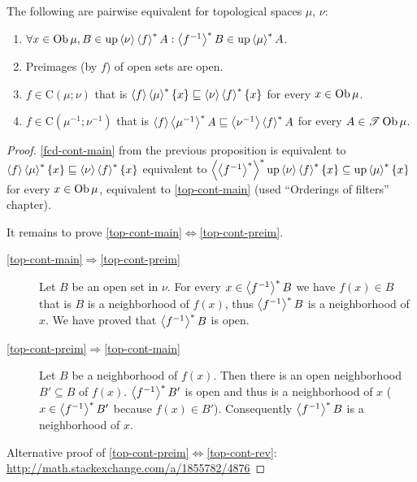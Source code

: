 \begin{cor}
  The following are pairwise equivalent for topological spaces $\mu$,
  $\nu$:
  \begin{enumerate}
    \item\label{top-cont-unfold} $\forall x \in \operatorname{Ob} \mu, B \in \operatorname{up} \left\langle \nu\right\rangle
    \left\langle f\right\rangle ^{\ast} A : \left\langle f^{- 1}\right\rangle ^{\ast} B \in
    \operatorname{up} \left\langle \mu\right\rangle ^{\ast} A$.

    \item\label{top-cont-preim} Preimages (by $f$) of open sets are open.

    \item\label{top-cont-main} $f \in \mathrm{C} (\mu; \nu)$ that is $\left\langle f\right\rangle
    \left\langle \mu\right\rangle ^{\ast} \{ x \} \sqsubseteq \left\langle \nu\right\rangle
    \left\langle f\right\rangle ^{\ast} \{ x \}$ for every $x \in \operatorname{Ob} \mu$.

    \item\label{top-cont-rev} $f \in \mathrm{C} (\mu^{- 1} ; \nu^{- 1})$ that is $\left\langle f\right\rangle
    \left\langle \mu^{- 1}\right\rangle ^{\ast} A \sqsubseteq \left\langle \nu^{- 1}\right\rangle
    \left\langle f\right\rangle ^{\ast} A$ for every $A \in \mathscr{T}
    \operatorname{Ob} \mu$.
  \end{enumerate}
\end{cor}

\begin{proof}
  \ref{fcd-cont-main} from the previous proposition is equivalent to
  $\left\langle f\right\rangle\left\langle \mu\right\rangle ^{\ast}\{x\}\sqsubseteq\left\langle \nu\right\rangle\left\langle f\right\rangle ^{\ast}\{x\}$
  equivalent to $\left\langle \left\langle f^{- 1}\right\rangle ^{\ast}\right\rangle ^{\ast}
  \operatorname{up} \left\langle \nu\right\rangle \left\langle f\right\rangle ^{\ast} \{ x \} \subseteq
  \operatorname{up} \left\langle \mu\right\rangle ^{\ast} \{ x \}$ for every $x \in \operatorname{Ob}
  \mu$, equivalent to \ref{top-cont-main} (used ``Orderings of filters'' chapter).

  It remains to prove \ref{top-cont-main}$\Leftrightarrow$\ref{top-cont-preim}.

  \begin{description}
  \item[\ref{top-cont-main}$\Rightarrow$\ref{top-cont-preim}] Let $B$ be an open set in $\nu$. For every $x \in
  \left\langle f^{- 1}\right\rangle ^{\ast} B$ we have $f (x) \in B$ that is $B$ is a
  neighborhood of $f (x)$, thus $\left\langle f^{-1}\right\rangle ^{\ast}B$ is a neighborhood of $x$. We have
  proved that $\left\langle f^{- 1}\right\rangle ^{\ast} B$ is open.

  \item[\ref{top-cont-preim}$\Rightarrow$\ref{top-cont-main}] Let $B$ be a neighborhood of $f (x)$. Then there is an
  open neighborhood $B' \subseteq B$ of $f (x)$. $\left\langle f^{-1}\right\rangle ^{\ast}
  B'$ is open and thus is a neighborhood of $x$ ($x \in \left\langle f^{-1}\right\rangle ^{\ast} B'$ because $f (x) \in B'$). Consequently
  $\left\langle f^{-1}\right\rangle ^{\ast} B$ is a neighborhood of $x$.
  \end{description}

  Alternative proof of \ref{top-cont-preim}$\Leftrightarrow$\ref{top-cont-rev}:
  \url{http://math.stackexchange.com/a/1855782/4876}
\end{proof}

